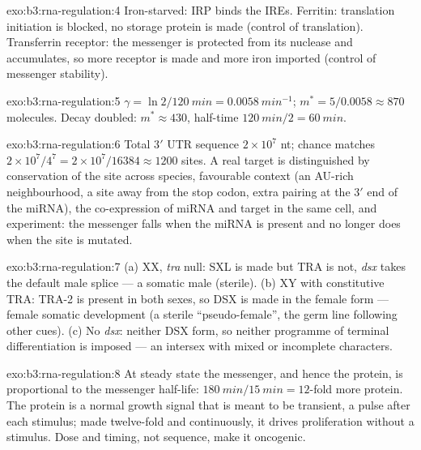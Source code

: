 \begin{solution}{exo:b3:rna-regulation:4}
Iron-starved: IRP binds the IREs. Ferritin: translation initiation is
blocked, no storage protein is made (control of translation).
Transferrin receptor: the messenger is protected from its nuclease and
accumulates, so more receptor is made and more iron imported (control
of messenger stability).
\end{solution}

\begin{solution}{exo:b3:rna-regulation:5}
$\gamma = \ln 2/\qty{120}{min} = \qty{0.0058}{min^{-1}}$; $m^{*} =
5/0.0058 \approx 870$ molecules. Decay doubled: $m^{*} \approx 430$,
half-time $\qty{120}{min}/2 = \qty{60}{min}$.
\end{solution}

\begin{solution}{exo:b3:rna-regulation:6}
Total 3$'$ UTR sequence $2\times 10^{7}$ nt; chance matches $2\times
10^{7}/4^{7} = 2\times 10^{7}/\num{16384} \approx \num{1200}$ sites.
A real target is distinguished by conservation of the site across
species, favourable context (an AU-rich neighbourhood, a site away from
the stop codon, extra pairing at the 3$'$ end of the miRNA), the
co-expression of miRNA and target in the same cell, and experiment: the
messenger falls when the miRNA is present and no longer does when the
site is mutated.
\end{solution}

\begin{solution}{exo:b3:rna-regulation:7}
(a) XX, \emph{tra} null: SXL is made but TRA is not, \emph{dsx} takes
the default male splice --- a somatic male (sterile). (b) XY with
constitutive TRA: TRA-2 is present in both sexes, so DSX is made in the
female form --- female somatic development (a sterile
``pseudo-female'', the germ line following other cues). (c) No
\emph{dsx}: neither DSX form, so neither programme of terminal
differentiation is imposed --- an intersex with mixed or incomplete
characters.
\end{solution}

\begin{solution}{exo:b3:rna-regulation:8}
At steady state the messenger, and hence the protein, is proportional
to the messenger half-life: $\qty{180}{min}/\qty{15}{min} = 12$-fold
more protein. The protein is a normal growth signal that is meant to
be transient, a pulse after each stimulus; made twelve-fold and
continuously, it drives proliferation without a stimulus. Dose and
timing, not sequence, make it oncogenic.
\end{solution}

